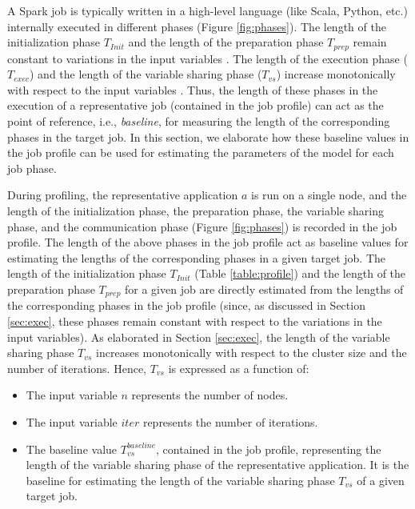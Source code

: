 \documentclass[conference]{IEEEtran}
\begin{document}
A Spark job is typically written in a high-level language (like Scala, Python, etc.) internally executed in different phases (Figure
   \ref{fig:phases}). The length of the initialization phase $\mathit{T_{\mathit{Init}}}$ and the length of the
  preparation phase ${T_{\mathit{prep}}}$ remain constant to variations in the input variables \cite{Zaharia:2012:RDD:2228298.2228301}. The length of
  the execution phase (${T_{\mathit{exec}}}$) and the length of the variable
    sharing phase  (${T_{\mathit{vs}}}$) increase monotonically with respect to the input variables \cite{Zaharia:2012:RDD:2228298.2228301}. Thus, the length
    of these phases in the execution of a representative job (contained in the job profile) can act as the point of reference, i.e., \emph{baseline}, for measuring
    the length of the corresponding phases in the target job.  In this section, we elaborate how these baseline values in the job profile
   can be used for estimating the parameters of the model for each job phase. \par During profiling,
 the representative application
 $a$ is run on a single node, and the length of the initialization phase, the preparation phase, the variable sharing phase, and the communication phase (Figure \ref{fig:phases}) is recorded in the job profile. The length  of the
 above phases in the job profile act as baseline values for estimating the lengths of the corresponding phases in a given target job.  The length of the initialization phase $\mathit{T_{\mathit{Init}}}$ (Table \ref{table:profile}) and the length of the
  preparation phase ${T_{\mathit{prep}}}$ for a given job are directly estimated from the lengths of the corresponding phases in the job
  profile (since, as discussed in Section \ref{sec:exec}, these phases remain constant with respect to the variations in the input variables).
  As elaborated in Section \ref{sec:exec}, the length of the variable sharing phase $\mathit{T_{\mathit{vs}}}$ increases monotonically \cite{Zaharia:2012:RDD:2228298.2228301}
  with respect to the cluster size and the number of iterations. Hence, $\mathit{T_{\mathit{vs}}}$ is expressed as a function of:
 \begin{itemize}
 \item The input   variable $n$ represents
 the number of nodes. \item  The input variable $\mathit{iter}$ represents the number of iterations. \item  The baseline value $\mathit{T_{\mathit{vs}}^{\mathit{baseline}}}$, contained in the job profile, representing the length of the
 variable sharing phase of the representative application. It is the
 baseline for estimating the length of the variable sharing phase $\mathit{T_{\mathit{vs}}}$ of a given target job. \end{itemize}
\end{document}
